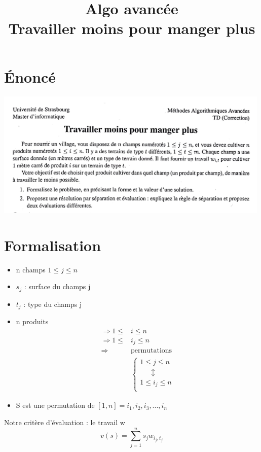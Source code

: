 \documentclass[11pt,a4paper]{article}
\title{Algo avancée \\ Travailler moins pour manger plus}
\begin{document}
	\maketitle
	\section{Énoncé}
	\includegraphics[width=0.99\textwidth]{Algo-tmpmp.jpg}
	
	\section{Formalisation}
	
	\begin{itemize}
		\item n champs $1 \leqslant j \leqslant n$
		\item $s_j$ : surface du champs j
		\item $t_j$ : type du champs j
		\item n produits \begin{align*}
							\Rightarrow 1 \leqslant &i \leqslant n\\
							\Rightarrow 1 \leqslant &i_j \leqslant n\\
							\Rightarrow &\text{permutations}\\
							&\begin{cases}
								1 \leqslant j \leqslant n\\
								\ \ \ \ \ \ \ \updownarrow\\
								1 \leqslant i_j \leqslant n\\
							\end{cases}
						 \end{align*}
		\item S est une permutation de $[1,n] = {i_1, i_2, i_3, ..., i_n}$
	\end{itemize}
	Notre critère d'évaluation : le travail w
	$$v(s)= \sum_{j=1}^{n} s_j w_{i_{j},t_{j}}$$
	
\end{document}
